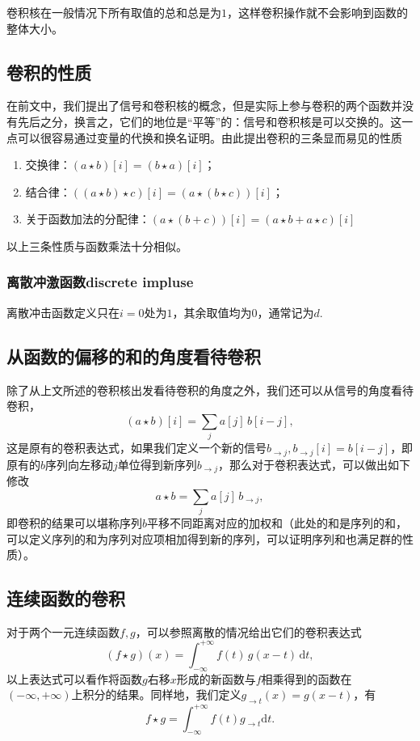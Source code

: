 \documentclass{ctexart}
\begin{document}
	卷积核在一般情况下所有取值的总和总是为$1$，这样卷积操作就不会影响到函数的整体大小。

	\subsection{卷积的性质}
	在前文中，我们提出了信号和卷积核的概念，但是实际上参与卷积的两个函数并没有先后之分，换言之，它们的地位是“平等”的：信号和卷积核是可以交换的。这一点可以很容易通过变量的代换和换名证明。由此提出卷积的三条显而易见的性质
	\begin{enumerate}
		\item 交换律：$(a\star b)[i]=(b\star a)[i]$；
		\item 结合律：$((a\star b)\star c)[i]=(a\star(b\star c))[i]$；
		\item 关于函数加法的分配律：$(a\star(b+c))[i]=(a\star b+a\star c)[i]$
	\end{enumerate}
	以上三条性质与函数乘法十分相似。

	\subsubsection{离散冲激函数discrete impluse}
	离散冲击函数定义只在$i=0$处为$1$，其余取值均为$0$，通常记为$d$.


	\subsection{从函数的偏移的和的角度看待卷积}
	除了从上文所述的卷积核出发看待卷积的角度之外，我们还可以从信号的角度看待卷积，
	$$
	(a\star b)[i]=\sum_j{a[j]\,b[i-j]},
	$$
	这是原有的卷积表达式，如果我们定义一个新的信号$b_{\to j},b_{\to j}[i]=b[i-j]$，即原有的$b$序列向左移动$j$单位得到新序列$b_{\to j}$，那么对于卷积表达式，可以做出如下修改
	$$
	a\star b=\sum_j{a[j]\, b_{\to j}},
	$$
	即卷积的结果可以堪称序列$b$平移不同距离对应的加权和（此处的和是序列的和，可以定义序列的和为序列对应项相加得到新的序列，可以证明序列和也满足群的性质）。

	\subsection{连续函数的卷积}
	对于两个一元连续函数$f,g$，可以参照离散的情况给出它们的卷积表达式
	$$
	(f\star g)(x)=\int_{-\infty}^{+\infty}{f(t)\, g(x-t)\,\mathrm dt},
	$$
	以上表达式可以看作将函数$g$右移$x$形成的新函数与$f$相乘得到的函数在$(-\infty,+\infty)$上积分的结果。同样地，我们定义$g_{\to t}(x)=g(x-t)$，有
	$$
	f\star g=\int_{-\infty}^{+\infty}{f(t)g_{\to t}\mathrm dt}.
	$$
\end{document}
